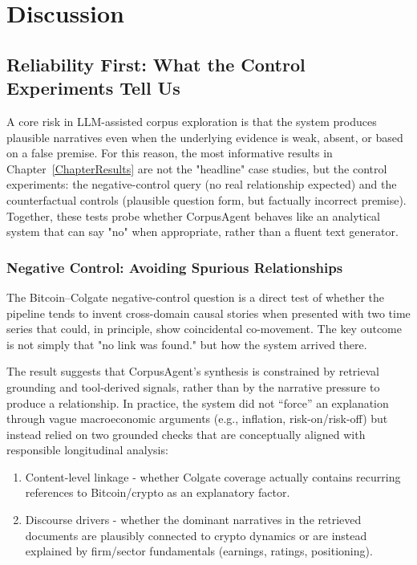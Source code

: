 
\chapter{Discussion} 
\label{ChapterDiscussion}

\section{Reliability First: What the Control Experiments Tell Us}

A core risk in LLM-assisted corpus exploration is that the system produces plausible narratives even when the underlying evidence is weak, absent, or based on a false premise. For this reason, the most informative results in Chapter~\ref{ChapterResults} are not the "headline" case studies, but the control experiments: the negative-control query (no real relationship expected) and the counterfactual controls (plausible question form, but factually incorrect premise). Together, these tests probe whether CorpusAgent behaves like an analytical system that can say "no" when appropriate, rather than a fluent text generator.

\subsection{Negative Control: Avoiding Spurious Relationships}

The Bitcoin–Colgate negative-control question is a direct test of whether the pipeline tends to invent cross-domain causal stories when presented with two time series that could, in principle, show coincidental co-movement. The key outcome is not simply that "no link was found." but how the system arrived there.

The result suggests that CorpusAgent’s synthesis is constrained by retrieval grounding and tool-derived signals, rather than by the narrative pressure to produce a relationship. In practice, the system did not “force” an explanation through vague macroeconomic arguments (e.g., inflation, risk-on/risk-off) but instead relied on two grounded checks that are conceptually aligned with responsible longitudinal analysis:

\begin{enumerate}
    \item Content-level linkage - whether Colgate coverage actually contains recurring references to Bitcoin/crypto as an explanatory factor.
    \item Discourse drivers - whether the dominant narratives in the retrieved documents are plausibly connected to crypto dynamics or are instead explained by firm/sector fundamentals (earnings, ratings, positioning).
\end{enumerate}

